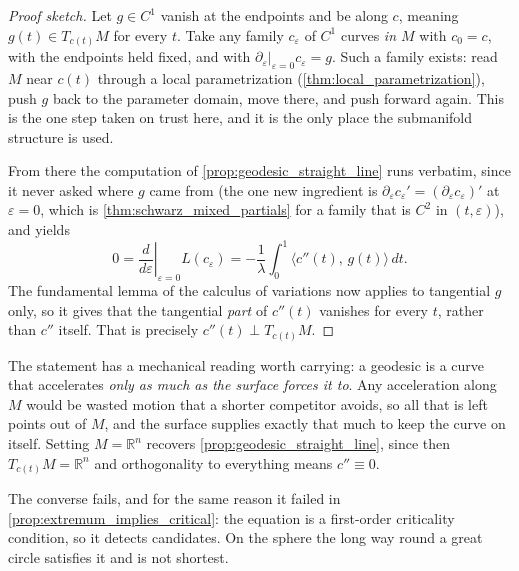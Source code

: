 \begin{proof}[Proof sketch]
Let $g \in C^1$ vanish at the endpoints and be  along $c$, meaning
$g(t) \in T_{c(t)}M$ for every $t$. Take any family $c_\varepsilon$ of $C^1$ curves \emph{in $M$}
with $c_0 = c$, with the endpoints held fixed, and with
$\partial_\varepsilon\big|_{\varepsilon=0}c_\varepsilon = g$. Such a family exists: read $M$ near
$c(t)$ through a local parametrization (\cref{thm:local_parametrization}), push $g$ back to the
parameter domain, move there, and push forward again. This is the one step taken on trust here,
and it is the only place the submanifold structure is used.

From there the computation of \cref{prop:geodesic_straight_line} runs verbatim, since it never
asked where $g$ came from (the one new ingredient is
$\partial_\varepsilon c_\varepsilon' = (\partial_\varepsilon c_\varepsilon)'$ at $\varepsilon = 0$,
which is \cref{thm:schwarz_mixed_partials} for a family that is $C^2$ in $(t,\varepsilon)$), and
yields
\[0 = \left.\frac{d}{d\varepsilon}\right|_{\varepsilon=0}L(c_\varepsilon)
    = -\frac1\lambda\int_0^1 \big\langle c''(t),\,g(t)\big\rangle\,dt.\]
The fundamental lemma of the calculus of variations now applies to tangential $g$ only, so it
gives that the tangential \emph{part} of $c''(t)$ vanishes for every $t$, rather than $c''$
itself. That is precisely $c''(t) \perp T_{c(t)}M$.
\end{proof}

\begin{remark}
The statement has a mechanical reading worth carrying: a geodesic is a curve that accelerates
\emph{only as much as the surface forces it to}. Any acceleration along $M$ would be wasted
motion that a shorter competitor avoids, so all that is left points out of $M$, and the surface
supplies exactly that much to keep the curve on itself. Setting $M = \mathbb{R}^n$ recovers
\cref{prop:geodesic_straight_line}, since then $T_{c(t)}M = \mathbb{R}^n$ and orthogonality to
everything means $c'' \equiv 0$.

The converse fails, and for the same reason it failed in \cref{prop:extremum_implies_critical}:
the equation is a first-order criticality condition, so it detects candidates. On the sphere the
long way round a great circle satisfies it and is not shortest.
\end{remark}

